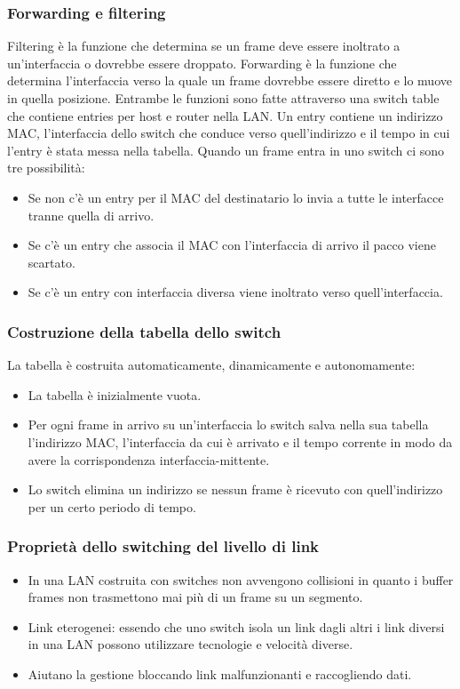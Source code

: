 \subsubsection{Forwarding e filtering}
Filtering \`e la funzione che determina se un frame deve essere inoltrato a un'interfaccia o dovrebbe essere droppato. Forwarding \`e la funzione che determina l'interfaccia verso la quale un frame dovrebbe
essere diretto e lo muove in quella posizione. Entrambe le funzioni sono fatte attraverso una switch table che contiene entries per host e router nella LAN. Un entry contiene un indirizzo MAC, l'interfaccia dello
switch che conduce verso quell'indirizzo e il tempo in cui l'entry \`e stata messa nella tabella. Quando un frame entra in uno switch ci sono tre possibilit\`a:
\begin{itemize}
\item Se non c'\`e un entry per il MAC del destinatario lo invia a tutte le interfacce tranne quella di arrivo.
\item Se c'\`e un entry che associa il MAC con l'interfaccia di arrivo il pacco viene scartato. 
\item Se c'\`e un entry con interfaccia diversa viene inoltrato verso quell'interfaccia.
\end{itemize}
\subsubsection{Costruzione della tabella dello switch}
La tabella \`e costruita automaticamente, dinamicamente e autonomamente:
\begin{itemize}
\item La tabella \`e inizialmente vuota.
\item Per ogni frame in arrivo su un'interfaccia lo switch salva nella sua tabella l'indirizzo MAC, l'interfaccia da cui \`e arrivato e il tempo corrente in modo da avere la corrispondenza interfaccia-mittente.
\item Lo switch elimina un indirizzo se nessun frame \`e ricevuto con quell'indirizzo per un certo periodo di tempo. 
\end{itemize}
\subsubsection{Propriet\`a dello switching del livello di link}
\begin{itemize}
\item In una LAN costruita con switches non avvengono collisioni in quanto i  buffer frames non trasmettono mai pi\`u di un frame su un segmento.
\item Link eterogenei: essendo che uno switch isola un link dagli altri i link diversi in una LAN possono utilizzare tecnologie e velocit\`a diverse.
\item Aiutano la gestione bloccando link malfunzionanti e raccogliendo dati. 
\end{itemize}

